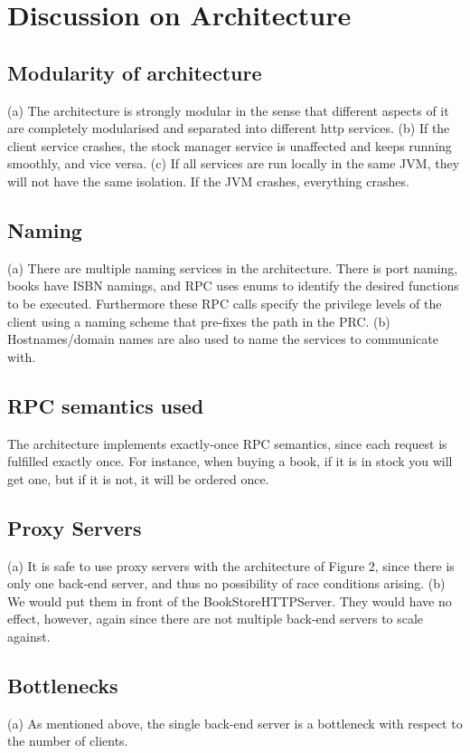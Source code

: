 \chapter{Discussion on Architecture}

\section{Modularity of architecture}
(a) The architecture is strongly modular in the sense that different aspects of it are completely modularised and separated into different http services. (b) If the client service crashes, the stock manager service is unaffected and keeps running smoothly, and vice versa. (c) If all services are run locally in the same JVM, they will not have the same isolation. If the JVM crashes, everything crashes.

\section{Naming}
(a) There are multiple naming services in the architecture. There is port naming, books have ISBN namings, and RPC uses enums to identify the desired functions to be executed. Furthermore these RPC calls specify the privilege levels of the client using a naming scheme that pre-fixes the path in the PRC. (b) Hostnames/domain names are also used to name the services to communicate with.

\section{RPC semantics used}
The architecture implements exactly-once RPC semantics, since each request is fulfilled exactly once. For instance, when buying a book, if it is in stock you will get one, but if it is not, it will be ordered once.

\section{Proxy Servers}
(a) It is safe to use proxy servers with the architecture of Figure 2, since there is only one back-end server, and thus no possibility of race conditions arising. (b) We would put them in front of the BookStoreHTTPServer. They would have no effect, however, again since there are not multiple back-end servers to scale against.

\section{Bottlenecks}
(a) As mentioned above, the single back-end server is a bottleneck with respect to the number of clients.


